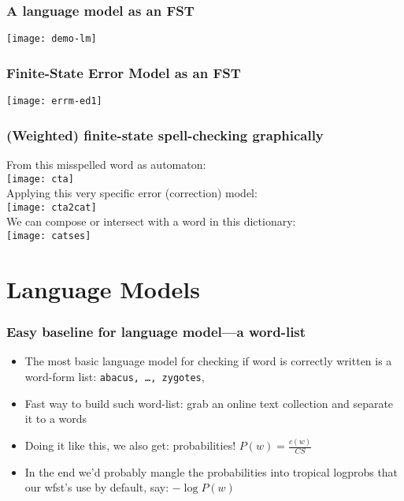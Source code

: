 \documentclass{beamer}
\begin{document}
\begin{frame}
    \frametitle{A language model as an FST}
    \texttt{[image: demo-lm]}
\end{frame}

\begin{frame}
    \frametitle{Finite-State Error Model as an FST}
    \texttt{[image: errm-ed1]}
\end{frame}

\begin{frame}
    \frametitle{(Weighted) finite-state spell-checking graphically}
    From this misspelled word as automaton:\\
    \texttt{[image: cta]}\\
    Applying this very specific error (correction) model:\\
\texttt{[image: cta2cat]}\\
    We can compose or intersect with a word in this dictionary:\\
\texttt{[image: catses]}\\
\end{frame}


\section{Language Models}

\begin{frame}
    \frametitle{Easy baseline for language model---a word-list}
    \begin{itemize}
        \item The most basic language model for checking if word is correctly
            written is a word-form list: \texttt{abacus, \ldots, zygotes}, 
        \item Fast way to build such word-list: grab an online text
            collection and separate it to a words
        \item Doing it like this, we also get: probabilities!
            $P(w) = \frac{c(w)}{CS}$
        \item In the end we'd probably mangle the probabilities into
            tropical logprobs that our wfst's use by default, say:
            $-\log P(w)$
    \end{itemize}
\end{frame}
\end{document}

